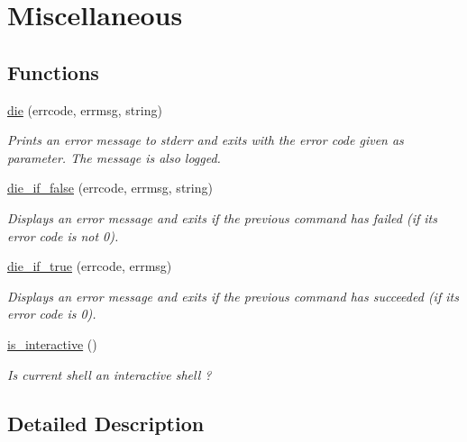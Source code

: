 \hypertarget{group__misc}{}\section{Miscellaneous}
\label{group__misc}
\subsection*{Functions}
\begin{DoxyCompactItemize}
\item 
\hyperlink{group__misc_gad27d9459ccd3e6c812ae0b285e47d7ed}{die} (errcode, errmsg, string)
\begin{DoxyCompactList}\small\item\em Prints an error message to stderr and exits with the error code given as parameter. The message is also logged. \end{DoxyCompactList}\item 
\hyperlink{group__misc_gaee8db3b60325e781e3e3037274e46411}{die\+\_\+if\+\_\+false} (errcode, errmsg, string)
\begin{DoxyCompactList}\small\item\em Displays an error message and exits if the previous command has failed (if its error code is not \textquotesingle{}0\textquotesingle{}). \end{DoxyCompactList}\item 
\hyperlink{group__misc_ga51f5ec17f1a80fdb9b339786645bf9fa}{die\+\_\+if\+\_\+true} (errcode, errmsg)
\begin{DoxyCompactList}\small\item\em Displays an error message and exits if the previous command has succeeded (if its error code is \textquotesingle{}0\textquotesingle{}). \end{DoxyCompactList}\item 
\mbox{\label{group__misc_ga0c121287140dbce260ccffefd385e3fc}} 
\hyperlink{group__misc_ga0c121287140dbce260ccffefd385e3fc}{is\+\_\+interactive} ()
\begin{DoxyCompactList}\small\item\em Is current shell an interactive shell ? \end{DoxyCompactList}\end{DoxyCompactItemize}


\subsection{Detailed Description}



